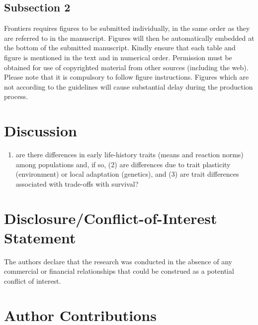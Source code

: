 \documentclass[utf8]{frontiersSCNS}
\providecommand{\tightlist}{%
  \setlength{\itemsep}{0pt}\setlength{\parskip}{0pt}}
\begin{document}
\hypertarget{subsection-2}{%
\subsection*{Subsection 2}\label{subsection-2}}

Frontiers requires figures to be submitted individually, in the same
order as they are referred to in the manuscript. Figures will then be
automatically embedded at the bottom of the submitted manuscript. Kindly
ensure that each table and figure is mentioned in the text and in
numerical order. Permission must be obtained for use of copyrighted
material from other sources (including the web). Please note that it is
compulsory to follow figure instructions. Figures which are not
according to the guidelines will cause substantial delay during the
production process.

\hypertarget{discussion}{%
\section{Discussion}\label{discussion}}

\begin{enumerate}
\def\labelenumi{(\arabic{enumi})}
\tightlist
\item
  are there differences in early life-history traits (means and reaction
  norms) among populations and, if so, (2) are differences due to trait
  plasticity (environment) or local adaptation (genetics), and (3) are
  trait differences associated with trade-offs with survival?
\end{enumerate}

\hypertarget{disclosureconflict-of-interest-statement}{%
\section*{Disclosure/Conflict-of-Interest
Statement}\label{disclosureconflict-of-interest-statement}}

The authors declare that the research was conducted in the absence of
any commercial or financial relationships that could be construed as a
potential conflict of interest.

\hypertarget{author-contributions}{%
\section*{Author Contributions}\label{author-contributions}}
\end{document}
